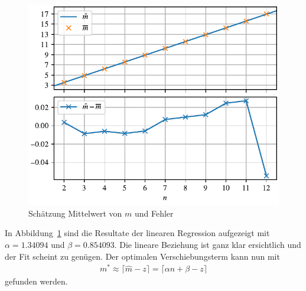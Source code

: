 \begin{figure}
\centering
% 
\includegraphics{papers/laguerre/images/estimates.pdf}
\caption{Schätzung Mittelwert von $m$ und Fehler}
\label{laguerre:fig:schaetzung}
\end{figure}

In Abbildung~\ref{laguerre:fig:schaetzung} sind die Resultate
der linearen Regression aufgezeigt mit $\alpha = 1.34094$ und $\beta =
0.854093$.
Die lineare Beziehung ist ganz klar ersichtlich und der Fit scheint zu genügen.
Der optimalen Verschiebungsterm kann nun mit
\begin{align*}
m^*
\approx
\lceil \hat{m} - z \rceil
=
\lceil \alpha n + \beta - z \rceil
\end{align*}
gefunden werden.


